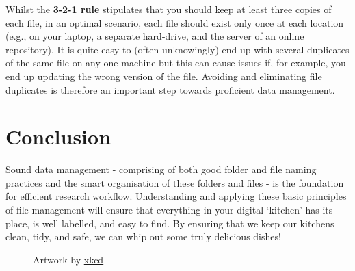 \documentclass[
  letterpaper,
  DIV=11,
  numbers=noendperiod]{scrreprt}
\begin{document}
Whilst the \textbf{3-2-1 rule} stipulates that you should keep at least
three copies of each file, in an optimal scenario, each file should
exist only once at each location (e.g., on your laptop, a separate
hard-drive, and the server of an online repository). It is quite easy to
(often unknowingly) end up with several duplicates of the same file on
any one machine but this can cause issues if, for example, you end up
updating the wrong version of the file. Avoiding and eliminating file
duplicates is therefore an important step towards proficient data
management.

\section{Conclusion}\label{conclusion}

Sound data management - comprising of both good folder and file naming
practices and the smart organisation of these folders and files - is the
foundation for efficient research workflow. Understanding and applying
these basic principles of file management will ensure that everything in
your digital `kitchen' has its place, is well labelled, and easy to
find. By ensuring that we keep our kitchens clean, tidy, and safe, we
can whip out some truly delicious dishes!

\begin{figure}


\caption{\label{fig-FileNamesComic}Artwork by
\href{https://xkcd.com/1459/}{xkcd}}

\end{figure}%
\end{document}
